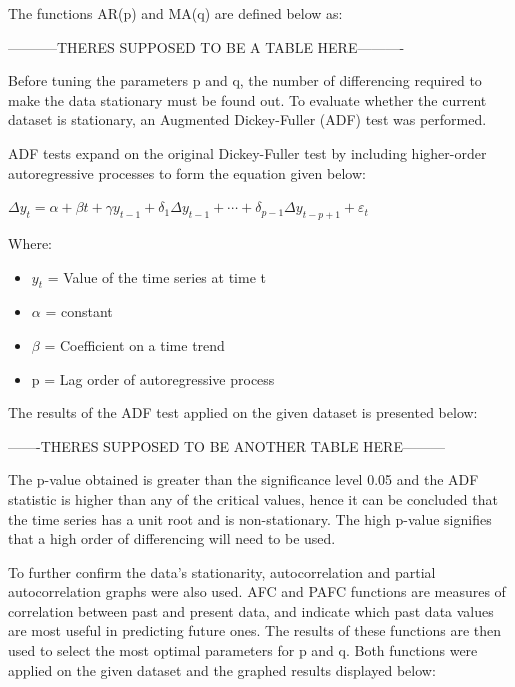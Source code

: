 \documentclass{mcmthesis}
\begin{document}
    The functions AR(p) and MA(q) are defined below as:
    
    -----------THERES SUPPOSED TO BE A TABLE HERE----------

    Before tuning the parameters p and q, the number of differencing required to make the data stationary must be found out. To evaluate whether the current dataset is stationary, an Augmented Dickey-Fuller (ADF) test was performed.

    ADF tests expand on the original Dickey-Fuller test by including higher-order autoregressive processes to form the equation given below:
    
    ${\Delta y_{t}=\alpha +\beta t+\gamma y_{t-1}+\delta _{1}\Delta y_{t-1}+\cdots +\delta _{p-1}\Delta y_{t-p+1}+\varepsilon _{t}}$

    Where:
    \begin{itemize}
        \item ${y_{t}}$ = Value of the time series at time t
        \item ${\alpha}$ = constant
        \item ${\beta}$ = Coefficient on a time trend
        \item {p} = Lag order of autoregressive process
    \end{itemize}
    
    The results of the ADF test applied on the given dataset is presented below:

    -------THERES SUPPOSED TO BE ANOTHER TABLE HERE---------

    The p-value obtained is greater than the significance level 0.05 and the ADF statistic is higher than any of the critical values, hence it can be concluded that the time series has a unit root and is non-stationary. The high p-value signifies that a high order of differencing will need to be used.

    To further confirm the data’s stationarity, autocorrelation and partial autocorrelation graphs were also used. AFC and PAFC functions are measures of correlation between past and present data, and indicate which past data values are most useful in predicting future ones.  The results of these functions are then used to select the most optimal parameters for p and q. Both functions were applied on the given dataset and the graphed results displayed below:
\end{document}
